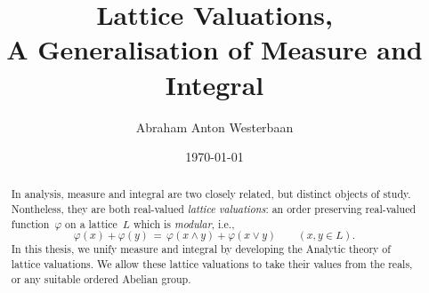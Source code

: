 \documentclass[main.tex]{subfiles}
\begin{document}
\title[A Generalisation of Measure and Integral]{Lattice Valuations,\\
A Generalisation of Measure and Integral}

\author[A.A.~Westerbaan]{Abraham Anton Westerbaan}
\date{\today \quad{\tiny \version}}
\maketitle

\begin{abstract}
In analysis,
measure and integral are two closely related,
but distinct objects of study.
Nontheless,
they are both real-valued \emph{lattice valuations}:
an order preserving real-valued function~$\varphi$
on a lattice~$L$
which is \emph{modular}, i.e.,
\begin{equation*}
\varphi(x) + \varphi(y) 
\,=\, 
\varphi(x\wedge y) + \varphi(x\vee y)\qquad(x,y\in L).
\end{equation*}
In this thesis,
we unify measure and integral
by developing the Analytic theory of lattice valuations.
We allow these lattice valuations
to take their values from the reals,
or any suitable ordered Abelian group.
\end{abstract}
\end{document}
